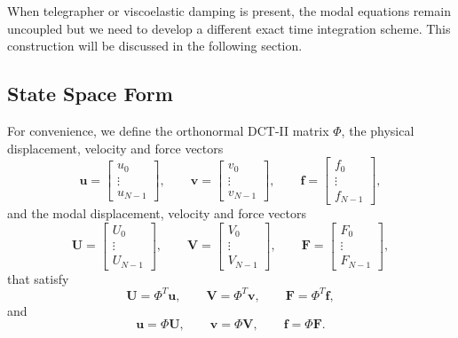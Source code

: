 \documentclass{Configuration_Files/PoliMi3i_thesis}
\begin{document}
When telegrapher or viscoelastic damping is present, the modal equations remain uncoupled but we need to develop a different exact time integration scheme. This construction will be discussed in the following section.

\subsection{State Space Form}
For convenience, we define the orthonormal DCT-II matrix $\Phi$, the physical displacement, velocity and force vectors
\begin{equation*}
\mathbf u
=
\begin{bmatrix}
u_0\\
\vdots\\
u_{N-1}
\end{bmatrix},
\qquad
\mathbf v
=
\begin{bmatrix}
v_0\\
\vdots\\
v_{N-1}
\end{bmatrix},
\qquad
\mathbf f
=
\begin{bmatrix}
f_0\\
\vdots\\
f_{N-1}
\end{bmatrix},
\end{equation*}
and the modal displacement, velocity and force vectors
\begin{equation*}
\mathbf U
=
\begin{bmatrix}
U_0\\
\vdots\\
U_{N-1}
\end{bmatrix},
\qquad
\mathbf V
=
\begin{bmatrix}
V_0\\
\vdots\\
V_{N-1}
\end{bmatrix},
\qquad
\mathbf F
=
\begin{bmatrix}
F_0\\
\vdots\\
F_{N-1}
\end{bmatrix},
\end{equation*}
that satisfy
\begin{equation*}
\mathbf U
=
\Phi^T\mathbf u,
\qquad
\mathbf V
=
\Phi^T\mathbf v,
\qquad
\mathbf F
=
\Phi^T\mathbf f,
\end{equation*}
and
\begin{equation*}
\mathbf u
=
\Phi\mathbf U,
\qquad
\mathbf v
=
\Phi\mathbf V,
\qquad
\mathbf f
=
\Phi\mathbf F.
\end{equation*}
\end{document}
